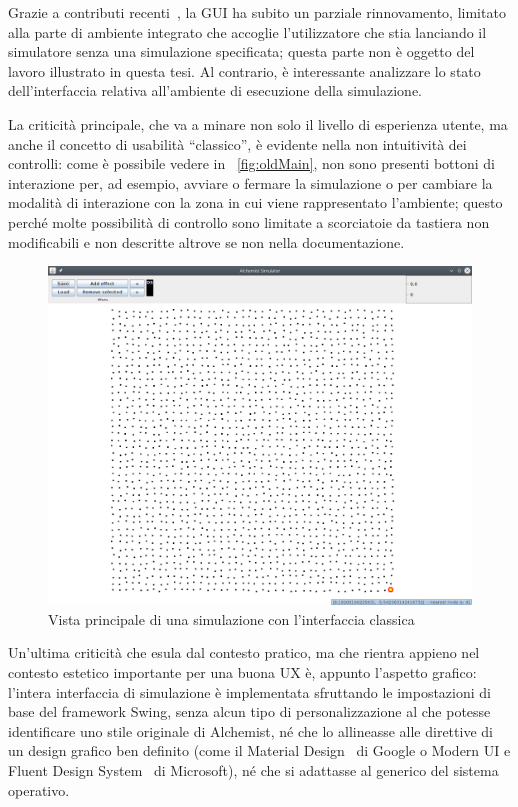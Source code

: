                 Grazie a contributi recenti~\cite{casadio}, la GUI ha subito un parziale rinnovamento, limitato alla parte di ambiente integrato che accoglie l'utilizzatore che stia lanciando il simulatore senza una simulazione specificata; questa parte non è oggetto del lavoro illustrato in questa tesi. Al contrario, è interessante analizzare lo stato dell'interfaccia relativa all'ambiente di esecuzione della simulazione.

                La criticità principale, che va a minare non solo il livello di esperienza utente, ma anche il concetto di usabilità  ``classico'', è evidente nella non intuitività dei controlli: come è possibile vedere in \figurename~\vref{fig:oldMain}, non sono presenti bottoni di interazione per, ad esempio, avviare o fermare la simulazione o per cambiare la modalità di interazione con la zona in cui viene rappresentato l'ambiente; questo perché molte possibilità di controllo sono limitate a scorciatoie da tastiera non modificabili e non descritte altrove se non nella documentazione.

                \begin{figure}[htbp]
                    \centering
                    \includegraphics[scale=.35]{img/oldMain}
                    \caption{Vista principale di una simulazione con l'interfaccia classica}
                    \label{fig:oldMain}
                \end{figure}

                Un'ultima criticità che esula dal contesto pratico, ma che rientra appieno nel contesto estetico importante per una buona UX è, appunto l'aspetto grafico: l'intera interfaccia di simulazione è implementata sfruttando le impostazioni di base del framework Swing, senza alcun tipo di personalizzazione al  che potesse identificare uno stile originale di Alchemist, né che lo allineasse alle direttive di un design grafico ben definito (come il Material Design~\cite{material} di Google o Modern UI e Fluent Design System~\cite{fluent} di Microsoft), né che si adattasse al  generico del sistema operativo.

